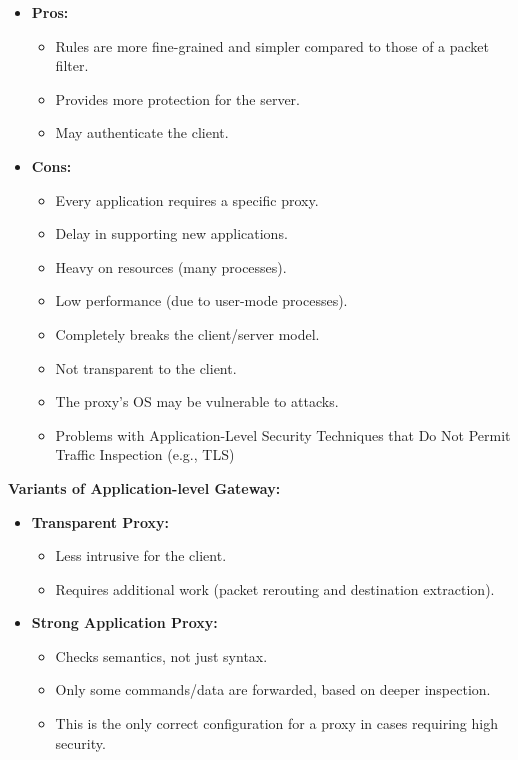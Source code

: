 \begin{itemize}
    \item \textbf{Pros:}
    \begin{itemize}
        \item Rules are more fine-grained and simpler compared to those of a packet filter.
        \item Provides more protection for the server.
        \item May authenticate the client.
    \end{itemize}
    \item \textbf{Cons:}
    \begin{itemize}
        \item Every application requires a specific proxy.
        \item Delay in supporting new applications.
        \item Heavy on resources (many processes).
        \item Low performance (due to user-mode processes).
        \item Completely breaks the client/server model.
        \item Not transparent to the client.
        \item The proxy's OS may be vulnerable to attacks.
        \item Problems with Application-Level Security Techniques that Do Not Permit Traffic Inspection (e.g., TLS)
    \end{itemize}
\end{itemize}

\textbf{Variants of Application-level Gateway:}
\begin{itemize}
    \item \textbf{Transparent Proxy:}
    \begin{itemize}
        \item Less intrusive for the client.
        \item Requires additional work (packet rerouting and destination extraction).
    \end{itemize}
    \item \textbf{Strong Application Proxy:}
    \begin{itemize}
        \item Checks semantics, not just syntax.
        \item Only some commands/data are forwarded, based on deeper inspection.
        \item This is the only correct configuration for a proxy in cases requiring high security.
    \end{itemize}
\end{itemize}

